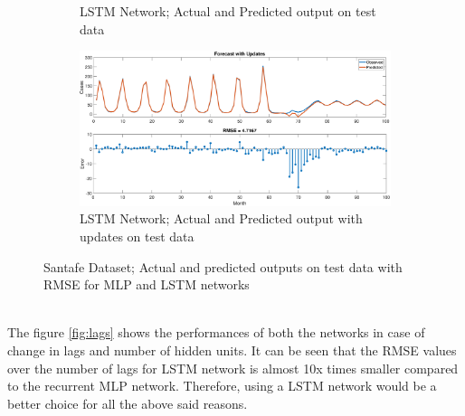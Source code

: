 \begin{figure}[!htpb]
\begin{subfigure}[b]{0.33\textwidth}
		\caption{LSTM Network; Actual and Predicted output on test data}\label{fig:lstm_forecast}
	\end{subfigure}%
	\begin{subfigure}[b]{0.33\textwidth}
		\captionsetup{width=1\linewidth, format = hang}
		\includegraphics[height = 0.8\textwidth,width = 1\textwidth]{Exercise2/Report/lstm_forecast_update}	
		\caption{LSTM Network; Actual and Predicted output with updates on test data}\label{fig:lstm_updates}
	\end{subfigure}%
	\caption{Santafe Dataset; Actual and predicted outputs on test data with RMSE for MLP and LSTM networks}
	\label{fig:forecasts}
\end{figure}\\
The figure \ref{fig:lags} shows the performances of both the networks in case of change in lags and number of hidden units. It can be seen that the RMSE values over the number of lags for LSTM network is almost 10x times smaller compared to the recurrent MLP network. Therefore, using a LSTM network would be a better choice for all the above said reasons.
